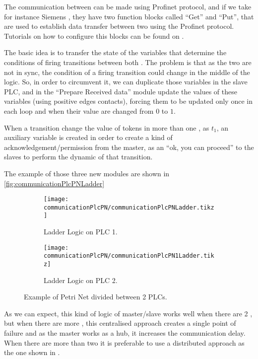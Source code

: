 The communication between \PLCs{} can be made using Profinet protocol, and if we
take for instance Siemens \PLCs, they have two function blocks called ``Get'' and
``Put'', that are used to establish data transfer between two \PLCs{} using the
Profinet protocol. Tutorials on how to configure this blocks can be found on \citep{antunesfloriano2019sincronizacao,oliveira2016protocolo,rochapereira2019automacao}.


The basic idea is to transfer the state of the variables that determine the
conditions of firing transitions between both \PLCs. The problem is that as the
two \PLCs are not in sync, the condition of a firing transition could change in
the middle of the logic. So, in order to circumvent it, we can duplicate those
variables in the slave PLC, and in the ``Prepare Received data'' module update
the values of these variables (using positive edges contacts), forcing them to
be updated only once in each loop and when their value are changed from $0$ to
$1$.

When a transition change the value of tokens in more than one \PLCs, as $t_1$,
an auxiliary variable is created in order to create a kind of
acknowledgement\slash permission 
from the master, as an ``ok, you can proceed'' to the slaves to perform the
dynamic of that transition.

The example of those three new modules are shown in \autoref{fig:communicationPlcPNLadder}

\begin{figure}[H]
  \centering
  \begin{subfigure}[t]{0.45\textwidth}
    \centering
    \texttt{[image: communicationPlcPN/communicationPlcPNLadder.tikz]}
    \caption{Ladder Logic on PLC 1.}
    \label{fig:communicationPlcPN1Ladder}
  \end{subfigure}%
  \hfill
  \begin{subfigure}[t]{0.45\textwidth}
    \centering
    \texttt{[image: communicationPlcPN/communicationPlcPN1Ladder.tikz]}
    \caption{Ladder Logic on PLC 2.}
    \label{fig:communicationPlcPN2Ladder}
  \end{subfigure}
  \caption{Example of Petri Net divided between 2 PLCs.}
  \label{fig:communicationPlcPNLadder}
\end{figure}
  
As we can expect, this kind of logic of master\slash slave works well when
there are 2 \PLCs, but when there are more \PLCs, this centralised approach
creates a single point of failure and as the master \PLC works as a hub, it
increases the communication delay. When there are more than two \PLCs it is
preferable to use a distributed approach as the one shown in
\cite{antunesfloriano2019sincronizacao}.


